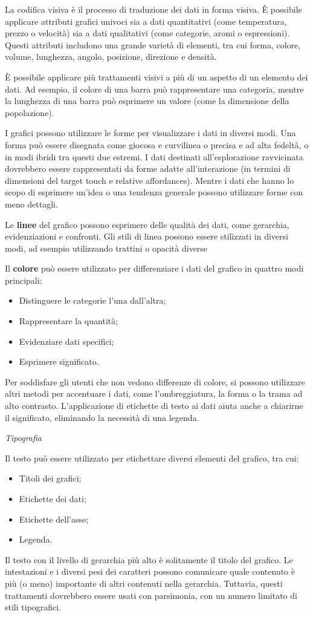 \documentclass[12pt, a4paper]{report}
\begin{document}
	La codifica visiva è il processo di traduzione dei dati in forma visiva. È possibile applicare attributi grafici univoci sia a dati quantitativi (come temperatura, prezzo o velocità) sia a dati qualitativi (come categorie, aromi o espressioni). Questi attributi includono una grande varietà di elementi, tra cui forma, colore, volume, lunghezza, angolo, posizione, direzione e densità.

	È possibile applicare più trattamenti visivi a più di un aspetto di un elemento dei dati. Ad esempio, il colore di una barra può rappresentare una categoria, mentre la lunghezza di una barra può esprimere un valore (come la dimensione della popolazione).

	I grafici possono utilizzare le forme per visualizzare i dati in diversi modi. Una forma può essere disegnata come giocosa e curvilinea o precisa e ad alta fedeltà, o in modi ibridi tra questi due estremi. I dati destinati all'esplorazione ravvicinata dovrebbero essere rappresentati da forme adatte all'interazione (in termini di dimensioni del target touch
	e relative affordances). Mentre i dati che hanno lo scopo di esprimere un'idea o una tendenza generale possono utilizzare forme con meno dettagli.

	Le \textbf{linee} del grafico possono esprimere delle qualità dei dati, come gerarchia, evidenziazioni e confronti. Gli stili di linea possono essere stilizzati in diversi modi, ad esempio utilizzando trattini o opacità diverse

	Il \textbf{colore} può essere utilizzato per differenziare i dati del grafico in quattro modi principali:
	\begin{itemize}
		\item Distinguere le categorie l'una dall'altra;
		\item Rappresentare la quantità;
		\item Evidenziare dati specifici;
		\item Esprimere significato.
	\end{itemize}
	Per soddisfare gli utenti che non vedono differenze di colore, si possono utilizzare altri metodi per accentuare i dati, come l'ombreggiatura, la forma o la trama ad alto contrasto. L'applicazione di etichette di testo ai dati aiuta anche a chiarirne il significato, eliminando la necessità di una legenda.

	\textit{Tipografia}

	Il testo può essere utilizzato per etichettare diversi elementi del grafico, tra cui:
	\begin{itemize}
		\item Titoli dei grafici;
		\item Etichette dei dati;
		\item Etichette dell'asse;
		\item Legenda.
	\end{itemize}
	Il testo con il livello di gerarchia più alto è solitamente il titolo del grafico. Le intestazioni e i diversi pesi dei caratteri possono comunicare quale contenuto è più (o meno) importante di altri contenuti nella gerarchia. Tuttavia, questi trattamenti dovrebbero essere usati con parsimonia, con un numero limitato di stili tipografici.
\end{document}
